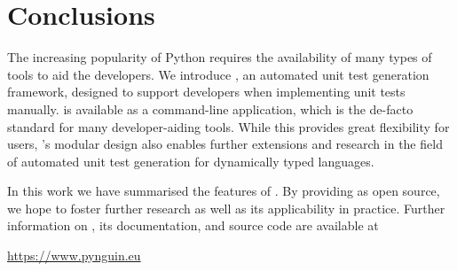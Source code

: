 \section{Conclusions}\label{sec:conclusions}

The increasing popularity of Python
requires the availability of many types of tools
to aid the developers.
%
We introduce \pynguin,
an automated unit test generation framework,
designed to support developers
when implementing unit tests manually.
%
\Pynguin is available as a command-line application,
which is the de-facto standard for many developer-aiding tools.
%
While this provides great flexibility for users,
\pynguin's modular design also enables further extensions
and research in the field of automated unit test generation
for dynamically typed languages.
%

%
In this work we have summarised the features of \pynguin.
%
By providing \pynguin as open source,
we hope to foster further research
as well as its applicability in practice.
%
Further information on \pynguin,
its documentation,
and source code
are available at
%
\begin{center}
  \url{https://www.pynguin.eu}
\end{center}


